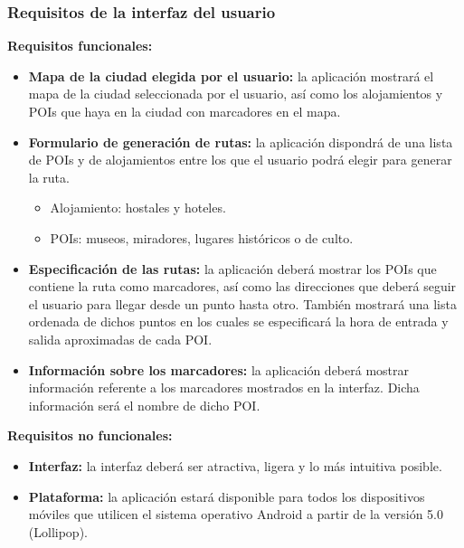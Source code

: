 \subsubsection[Requisitos interfaz]{Requisitos de la interfaz del usuario}
\textbf{Requisitos funcionales:}
\begin{itemize}
	\item \textbf{Mapa de la ciudad elegida por el usuario:} la aplicación mostrará el mapa de la ciudad seleccionada por el usuario, así como los alojamientos y POIs que haya en la ciudad con marcadores en el mapa.
	\item\textbf{ Formulario de generación de rutas:} la aplicación dispondrá de una lista de POIs y de alojamientos entre los que el usuario podrá elegir para generar la ruta. 
	\begin{itemize}
		\item Alojamiento: hostales y hoteles.
		\item POIs: museos, miradores, lugares históricos o de culto.
	\end{itemize}
	\item\textbf{ Especificación de las rutas:} la aplicación deberá mostrar los POIs que contiene la ruta como marcadores, así como las direcciones que deberá seguir el usuario para llegar desde un punto hasta otro. También mostrará una lista ordenada de dichos puntos en los cuales se especificará la hora de entrada y salida aproximadas de cada POI.
	\item \textbf{Información sobre los marcadores:} la aplicación deberá mostrar información referente a los marcadores mostrados en la interfaz. Dicha información será el nombre de dicho POI.
\end{itemize}
\textbf{Requisitos no funcionales:}
\begin{itemize}
	\item \textbf{Interfaz:} la interfaz deberá ser atractiva, ligera y lo más intuitiva posible.
	\item \textbf{Plataforma:} la aplicación estará disponible para todos los dispositivos móviles que utilicen el sistema operativo Android a partir de la versión 5.0 (Lollipop).
\end{itemize}

